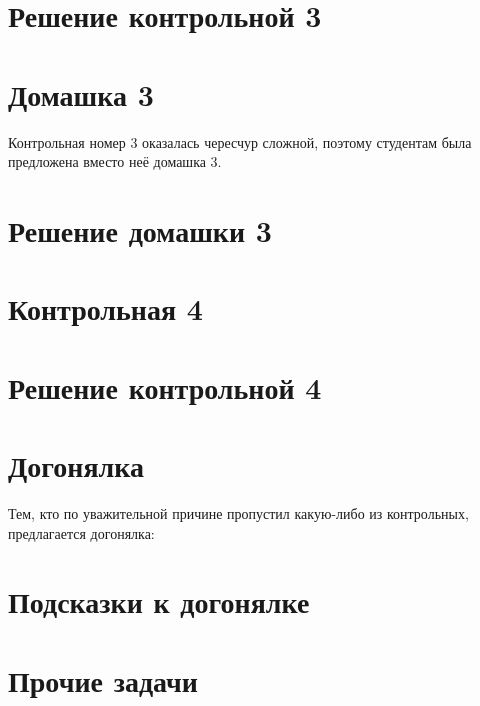 \documentclass[11pt, openany]{book}
\numberwithin{equation}{page} %
\theoremstyle{definition} %
\theoremstyle{definition}
\theoremstyle{definition}
\begin{document}


\section{Решение контрольной 3}



\section{Домашка 3}

Контрольная номер 3 оказалась чересчур сложной, поэтому студентам была предложена вместо неё домашка 3.




\section{Решение домашки 3}






\section{Контрольная 4}



\section{Решение контрольной 4}




\section{Догонялка}

Тем, кто по уважительной причине пропустил какую-либо из контрольных, предлагается догонялка:



\section{Подсказки к догонялке}



\section{Прочие задачи}
\end{document}
